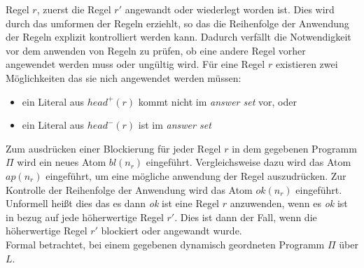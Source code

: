 Regel $r$, zuerst die Regel $r'$ angewandt oder wiederlegt worden ist.
Dies wird durch das umformen der Regeln erziehlt, so das die Reihenfolge
der Anwendung der Regeln explizit kontrolliert werden kann.
Dadurch verfällt die Notwendigkeit vor dem anwenden von Regeln zu prüfen,
ob eine andere Regel vorher angewendet werden muss oder ungültig wird.
Für eine Regel $r$ existieren zwei Möglichkeiten das sie nich angewendet werden
müssen:
\begin{itemize}
  \item ein Literal aus $head^+(r)$ kommt nicht im \emph{answer set} vor, oder
  \item ein Literal aus $head^-(r)$ ist im \emph{answer set}
\end{itemize}
Zum ausdrücken einer Blockierung für jeder Regel $r$ in dem gegebenen Programm $\Pi$
wird ein neues Atom $bl(n_r)$ eingeführt.
Vergleichsweise dazu wird das Atom $ap(n_r)$ eingeführt, um eine mögliche anwendung
der Regel auszudrücken.
Zur Kontrolle der Reihenfolge der Anwendung wird das Atom $ok(n_r)$ eingeführt.
Unformell heißt dies das es dann \emph{ok} ist eine Regel $r$ anzuwenden, wenn
es \emph{ok} ist in bezug auf jede höherwertige Regel $r'$.
Dies ist dann der Fall, wenn die höherwertige Regel $r'$ blockiert oder angewandt
wurde.\\
Formal betrachtet, bei einem gegebenen dynamisch geordneten Programm $\Pi$ über $L$.







